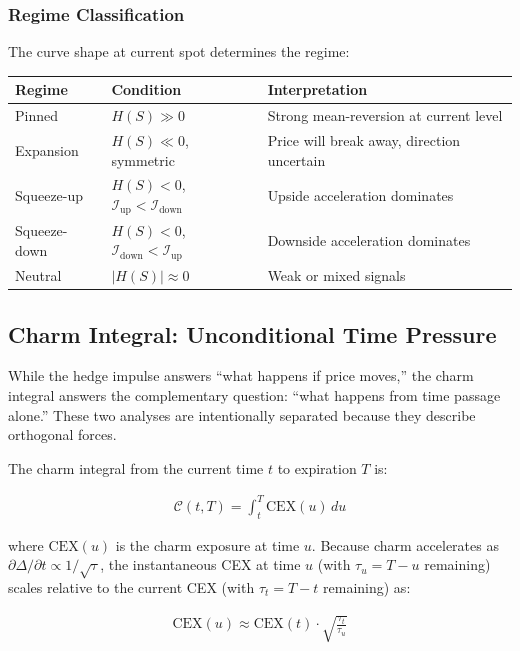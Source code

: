 \documentclass[11pt, a4paper]{article}
\begin{document}
\subsubsection{Regime Classification}

The curve shape at current spot determines the regime:

\begin{center}
\begin{tabular}{l|l|l}
\textbf{Regime} & \textbf{Condition} & \textbf{Interpretation} \\
\hline
Pinned & $H(S) \gg 0$ & Strong mean-reversion at current level \\
Expansion & $H(S) \ll 0$, symmetric & Price will break away, direction uncertain \\
Squeeze-up & $H(S) < 0$, $\mathcal{I}_{\text{up}} < \mathcal{I}_{\text{down}}$ & Upside acceleration dominates \\
Squeeze-down & $H(S) < 0$, $\mathcal{I}_{\text{down}} < \mathcal{I}_{\text{up}}$ & Downside acceleration dominates \\
Neutral & $|H(S)| \approx 0$ & Weak or mixed signals \\
\end{tabular}
\end{center}

\subsection{Charm Integral: Unconditional Time Pressure}

While the hedge impulse answers ``what happens if price moves,'' the charm integral answers the complementary question: ``what happens from time passage alone.'' These two analyses are intentionally separated because they describe orthogonal forces.

The charm integral from the current time $t$ to expiration $T$ is:

\begin{align}
\mathcal{C}(t, T) = \int_t^T \text{CEX}(u) \, du
\end{align}

where $\text{CEX}(u)$ is the charm exposure at time $u$. Because charm accelerates as $\partial\Delta/\partial t \propto 1/\sqrt{\tau}$, the instantaneous CEX at time $u$ (with $\tau_u = T - u$ remaining) scales relative to the current CEX (with $\tau_t = T - t$ remaining) as:

\begin{align}
\text{CEX}(u) \approx \text{CEX}(t) \cdot \sqrt{\frac{\tau_t}{\tau_u}}
\end{align}
\end{document}
